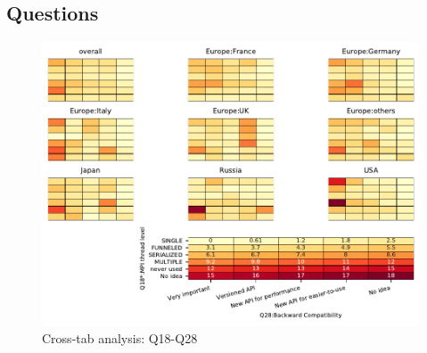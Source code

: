 
\subsection{Questions}


\begin{figure}
\begin{center}
\includegraphics[width=12cm]{../pdfs/Q18-Q28.pdf}
\caption{Cross-tab analysis: Q18-Q28}
\label{fig:Q18-Q28}
\end{center}
\end{figure}

